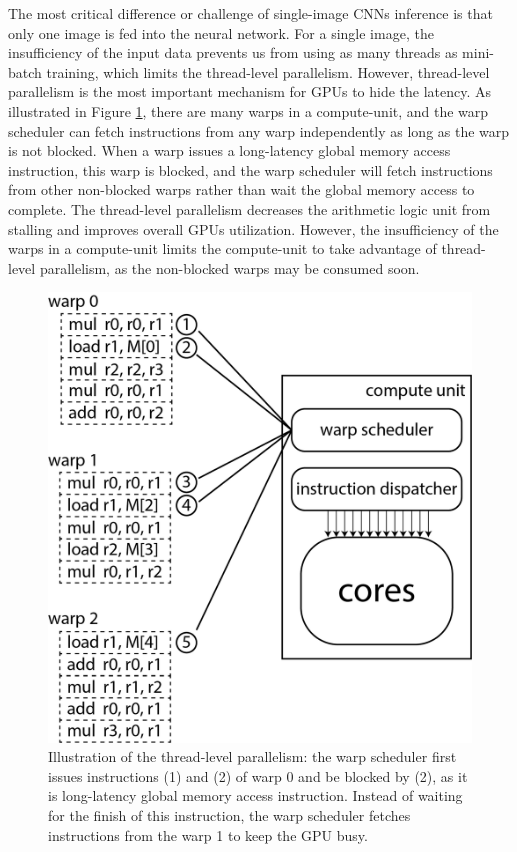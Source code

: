 \documentclass{article}
\begin{document}
The most critical difference or challenge of single-image CNNs inference is that only one image is fed into the neural network. For a single image, the insufficiency of the input data prevents us from using as many threads as mini-batch training, which limits the thread-level parallelism. However, thread-level parallelism is the most important mechanism for GPUs to hide the latency. As illustrated in Figure \ref{tlp_fig}, there are many warps in a compute-unit, and the warp scheduler can fetch instructions from any warp independently as long as the warp is not blocked. When a warp issues a  long-latency global memory access instruction, this warp is blocked, and the warp scheduler will fetch instructions from other non-blocked warps rather than wait the global memory access to complete. The thread-level parallelism decreases the arithmetic logic unit from stalling and improves overall GPUs utilization. However, the insufficiency of the warps in a compute-unit limits the compute-unit to take advantage of thread-level parallelism, as the non-blocked warps may be consumed soon.

\begin{figure}[h!]
\centering

\includegraphics[width=0.45\linewidth]{TLP.png}

\caption{Illustration of the thread-level parallelism: the warp scheduler first issues instructions (1) and (2) of warp 0 and be blocked by (2), as it is long-latency global memory access instruction. Instead of waiting for the finish of this instruction, the warp scheduler fetches instructions from the warp 1 to keep the GPU busy. \label{tlp_fig}}

\end{figure}
\end{document}
